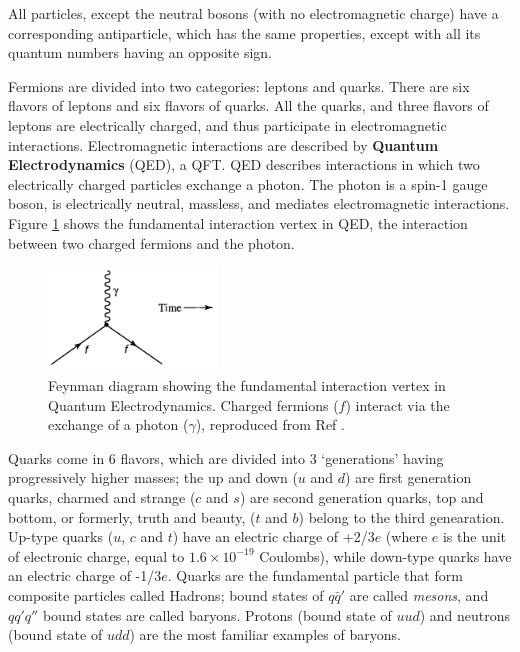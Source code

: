 \documentclass[11pt,a4paper,openright,twoside]{report}
\begin{document}
All particles, except the neutral bosons (with no electromagnetic charge) have a corresponding antiparticle, which has the same properties, except with all its quantum numbers having an opposite sign.

Fermions are divided into two categories: leptons and quarks. There are six flavors of leptons and six flavors of quarks. All the quarks, and three flavors of leptons are electrically charged, and thus participate in electromagnetic interactions. Electromagnetic interactions are described by \textbf{Quantum Electrodynamics} (QED)\cite{QED}, a QFT. QED describes interactions in which two electrically charged particles exchange a photon. The photon is a spin-1 gauge boson, is electrically neutral, massless, and mediates electromagnetic interactions. Figure \ref{fig:qed_fund_vertex} shows the fundamental interaction vertex in QED, the interaction between two charged fermions and the photon.

\begin{figure}[H]
\centering
\includegraphics[width = 0.4\textwidth]{fundamental_vertex_qed.png}
\caption{Feynman diagram showing the fundamental interaction vertex in Quantum Electrodynamics. Charged fermions ($f$) interact via the exchange of a photon ($\gamma$), reproduced from Ref \cite{griff}.}
\label{fig:qed_fund_vertex}
\end{figure}

Quarks come in 6 flavors, which are divided into 3 `generations' having progressively higher masses; the up and down ($u$ and $d$) are first generation quarks, charmed and strange ($c$ and $s$) are second generation quarks, top and bottom, or formerly, truth and beauty, ($t$ and $b$) belong to the third genearation. Up-type quarks ($u$, $c$ and $t$) have an electric charge of +2/3$e$ (where $e$ is the unit of electronic charge, equal to $1.6\times 10^{-19}$ Coulombs), while down-type quarks have an electric charge of -1/3$e$. Quarks are the fundamental particle that form composite particles called Hadrons; bound states of $q\bar{q}'$ are called \textit{mesons}, and $qq'q''$ bound states are called baryons. Protons (bound state of $uud$) and neutrons (bound state of $udd$) are the most familiar examples of baryons.
\end{document}
